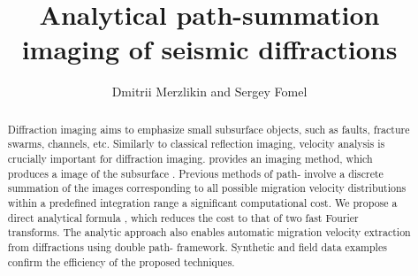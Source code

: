 
\title{Analytical path-summation imaging of seismic diffractions}
\author{Dmitrii Merzlikin and Sergey Fomel}


\address{
Bureau of Economic Geology \\
John A. and Katherine G. Jackson School of Geosciences \\
The University of Texas at Austin \\
University Station, Box X \\
Austin, TX 78713-8924 \\
dmitrii.merzlikin@utexas.edu
}

\maketitle

\begin{abstract}
Diffraction imaging aims to emphasize small subsurface objects, such as faults, fracture swarms, channels, etc.
Similarly to classical reflection imaging, 
velocity analysis is crucially important for  diffraction imaging.  
provides an imaging method, which produces a
image of the subsurface . 
Previous methods of path-  involve a discrete summation of the
images corresponding to all possible migration velocity distributions within a predefined
integration range  a significant computational cost. 
We propose a direct analytical formula , which reduces the cost 
to that of  two fast Fourier transforms.
The analytic approach also enables automatic
migration velocity extraction from diffractions using double path- framework.
Synthetic and field data examples confirm the efficiency 
of the proposed techniques.
\end{abstract}  

